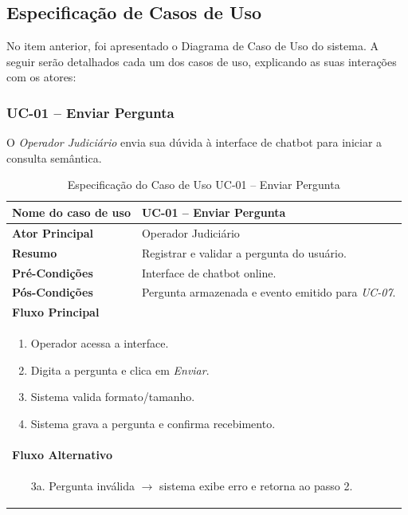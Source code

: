 \subsection{Especificação de Casos de Uso}
\label{sec:especificacao-casos-uso}
No item anterior, foi apresentado o Diagrama de Caso de Uso do sistema. 
A seguir serão detalhados cada um dos casos de uso, explicando as suas interações 
com os atores:

\subsubsection{UC-01 – Enviar Pergunta}

\noindent
O \textit{Operador Judiciário} envia sua dúvida à interface de chatbot
para iniciar a consulta semântica.

\begin{table}[H]
\centering
\caption{Especificação do Caso de Uso UC-01 – Enviar Pergunta}
\label{tab:uc01}
\begin{tabular}{|p{4cm}|p{11cm}|}
\hline
\textbf{Nome do caso de uso} & UC-01 – Enviar Pergunta \\ \hline
\textbf{Ator Principal}      & Operador Judiciário \\ \hline
\textbf{Resumo}              & Registrar e validar a pergunta do usuário. \\ \hline
\textbf{Pré-Condições}       & Interface de chatbot online. \\ \hline
\textbf{Pós-Condições}       & Pergunta armazenada e evento emitido para \emph{UC-07}. \\ \hline
\multicolumn{2}{|l|}{\textbf{Fluxo Principal}} \\ \hline
\multicolumn{2}{|p{15cm}|}{%
\begin{enumerate}[label=\arabic*.,leftmargin=*]
  \item Operador acessa a interface.
  \item Digita a pergunta e clica em \textit{Enviar}.
  \item Sistema valida formato/tamanho.
  \item Sistema grava a pergunta e confirma recebimento.
\end{enumerate}} \\ \hline
\multicolumn{2}{|l|}{\textbf{Fluxo Alternativo}} \\ \hline
\multicolumn{2}{|p{15cm}|}{%
\begin{enumerate}[label=\arabic*a.,leftmargin=*]
  \item[3a.] Pergunta inválida $\rightarrow$ sistema exibe erro e retorna ao passo 2.
\end{enumerate}} \\ \hline
\end{tabular}
\end{table}


